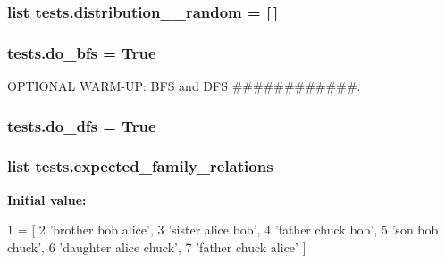 \subsubsection[{distribution\+\_\+5\+\_\+random}]{\setlength{\rightskip}{0pt plus 5cm}list tests.\+distribution\+\_\+\_\+random = \mbox{[}$\,$\mbox{]}}\label{namespacetests_a47b204c4e788c5641d2766790e212c43}
\hypertarget{namespacetests_a00808ade50df82ecad4adbfbef73aff3}{}
\subsubsection[{do\+\_\+bfs}]{\setlength{\rightskip}{0pt plus 5cm}tests.\+do\+\_\+bfs = True}\label{namespacetests_a00808ade50df82ecad4adbfbef73aff3}


O\+P\+T\+I\+O\+N\+A\+L W\+A\+R\+M-\/\+U\+P\+: B\+F\+S and D\+F\+S \#\#\#\#\#\#\#\#\#\#\#\#. 

\hypertarget{namespacetests_ae35b4bf9dd1c0354e417f1878c507fc8}{}
\subsubsection[{do\+\_\+dfs}]{\setlength{\rightskip}{0pt plus 5cm}tests.\+do\+\_\+dfs = True}\label{namespacetests_ae35b4bf9dd1c0354e417f1878c507fc8}
\hypertarget{namespacetests_a6f541fd17dfa0fecf1cae81098cae4fd}{}
\subsubsection[{expected\+\_\+family\+\_\+relations}]{\setlength{\rightskip}{0pt plus 5cm}list tests.\+expected\+\_\+family\+\_\+relations}\label{namespacetests_a6f541fd17dfa0fecf1cae81098cae4fd}
{\bfseries Initial value\+:}
\begin{DoxyCode}
1 = [
2     \textcolor{stringliteral}{'brother bob alice'},
3     \textcolor{stringliteral}{'sister alice bob'},
4     \textcolor{stringliteral}{'father chuck bob'},
5     \textcolor{stringliteral}{'son bob chuck'},
6     \textcolor{stringliteral}{'daughter alice chuck'},
7     \textcolor{stringliteral}{'father chuck alice'} ]
\end{DoxyCode}
\hypertarget{namespacetests_a22847012a44a5628b53cb446b65ae99b}{}
